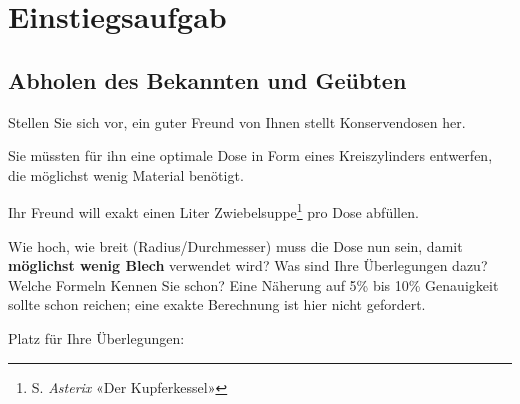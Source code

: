 
\section*{Einstiegsaufgab}

\subsection*{Abholen des Bekannten und Geübten}

Stellen Sie sich vor, ein guter Freund von Ihnen stellt Konservendosen her.

Sie müssten für ihn eine optimale Dose in Form eines Kreiszylinders entwerfen, die möglichst wenig
Material benötigt.

\begin{center}
\end{center}

Ihr Freund will exakt einen Liter
Zwiebelsuppe\footnote{S. \textit{Asterix} «Der Kupferkessel»} pro Dose abfüllen.

Wie hoch, wie breit (Radius/Durchmesser) muss die Dose nun sein,
damit \textbf{möglichst wenig Blech} verwendet wird? Was sind Ihre
Überlegungen dazu? Welche Formeln Kennen Sie schon? Eine Näherung auf
5\% bis 10\% Genauigkeit sollte schon reichen; eine exakte Berechnung ist hier nicht gefordert.


\newpage
Platz für Ihre Überlegungen:

